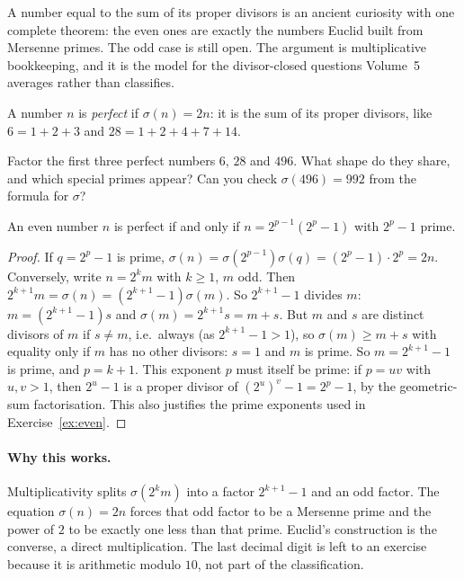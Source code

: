 A number equal to the sum of its proper divisors is an ancient curiosity with one complete theorem: the even ones are exactly the numbers Euclid built from Mersenne primes. The odd case is still open. The argument is multiplicative bookkeeping, and it is the model for the divisor-closed questions Volume~5 averages rather than classifies.

A number $n$ is \emph{perfect} if $\sigma(n)=2n$: it is the sum of its proper divisors, like $6=1+2+3$ and $28=1+2+4+7+14$.

\begin{think}
Factor the first three perfect numbers $6$, $28$ and $496$. What shape do they share, and which special primes appear? Can you check $\sigma(496)=992$ from the formula for $\sigma$?
\end{think}

\begin{theorem}\label{thm:perfect}
An even number $n$ is perfect if and only if $n=2^{p-1}(2^p-1)$ with $2^p-1$ prime.
\end{theorem}
\begin{proof}
If $q=2^p-1$ is prime, $\sigma(n)=\sigma(2^{p-1})\sigma(q)=(2^p-1)\cdot2^p=2n$.
Conversely, write $n=2^km$ with $k\ge1$, $m$ odd. Then $2^{k+1}m=\sigma(n)=(2^{k+1}-1)\sigma(m)$. So $2^{k+1}-1$ divides $m$: $m=(2^{k+1}-1)s$ and $\sigma(m)=2^{k+1}s=m+s$. But $m$ and $s$ are distinct divisors of $m$ if $s\ne m$, i.e.\ always (as $2^{k+1}-1>1$), so $\sigma(m)\ge m+s$ with equality only if $m$ has no other divisors: $s=1$ and $m$ is prime. So $m=2^{k+1}-1$ is prime, and $p=k+1$.
This exponent $p$ must itself be prime: if $p=uv$ with $u,v>1$, then
$2^u-1$ is a proper divisor of $(2^u)^v-1=2^p-1$, by the geometric-sum
factorisation. This also justifies the prime exponents used in
Exercise~\ref{ex:even}.
\end{proof}

\paragraph{Why this works.}
Multiplicativity splits $\sigma(2^km)$ into a factor $2^{k+1}-1$ and an odd factor. The equation $\sigma(n)=2n$ forces that odd factor to be a Mersenne prime and the power of $2$ to be exactly one less than that prime. Euclid's construction is the converse, a direct multiplication. The last decimal digit is left to an exercise because it is arithmetic modulo $10$, not part of the classification.

